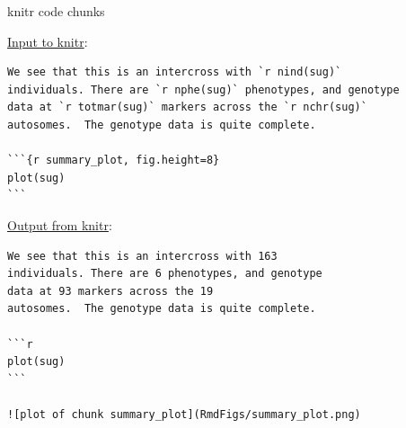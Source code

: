 \documentclass[12pt,t]{beamer}
\begin{document}
\begin{frame}[fragile]{knitr code chunks}

\vspace{6pt}

\href{https://github.com/kbroman/Tools4RR/blob/master/03_KnitrMarkdown/Examples/example1.Rmd}{Input to knitr}:
\begin{lstlisting}
We see that this is an intercross with `r nind(sug)`
individuals. There are `r nphe(sug)` phenotypes, and genotype
data at `r totmar(sug)` markers across the `r nchr(sug)`
autosomes.  The genotype data is quite complete.

```{r summary_plot, fig.height=8}
plot(sug)
```
\end{lstlisting}

\vfill

\href{https://github.com/kbroman/Tools4RR/blob/master/03_KnitrMarkdown/Examples/example1.md}{Output from knitr}:
\begin{lstlisting}
We see that this is an intercross with 163
individuals. There are 6 phenotypes, and genotype
data at 93 markers across the 19
autosomes.  The genotype data is quite complete.

```r
plot(sug)
```

![plot of chunk summary_plot](RmdFigs/summary_plot.png)
\end{lstlisting}


\end{frame}
\end{document}
